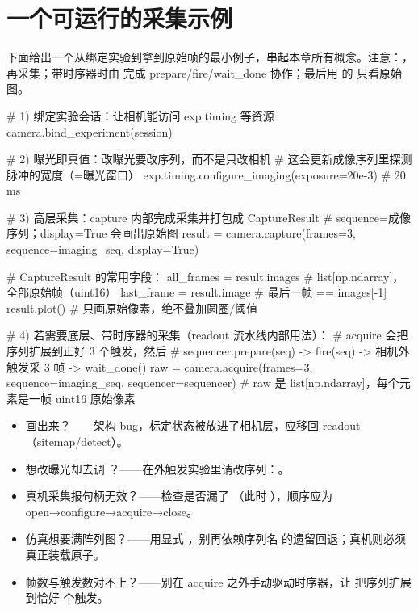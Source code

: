\documentclass[11pt,oneside,openany]{book}
\begin{document}
\section{一个可运行的采集示例}

下面给出一个从绑定实验到拿到原始帧的最小例子，串起本章所有概念。注意：，再采集；带时序器时由  完成 prepare/fire/wait\_done 协作；最后用  的  只看原始图。

\begin{codeblock}[Python]
# 1) 绑定实验会话：让相机能访问 exp.timing 等资源
camera.bind_experiment(session)

# 2) 曝光即真值：改曝光要改序列，而不是只改相机
#    这会更新成像序列里探测脉冲的宽度（=曝光窗口）
exp.timing.configure_imaging(exposure=20e-3)  # 20 ms

# 3) 高层采集：capture 内部完成采集并打包成 CaptureResult
#    sequence=成像序列；display=True 会画出原始图
result = camera.capture(frames=3, sequence=imaging_seq, display=True)

# CaptureResult 的常用字段：
all_frames = result.images   # list[np.ndarray]，全部原始帧（uint16）
last_frame = result.image    # 最后一帧 == images[-1]
result.plot()                # 只画原始像素，绝不叠加圆圈/阈值

# 4) 若需要底层、带时序器的采集（readout 流水线内部用法）：
#    acquire 会把序列扩展到正好 3 个触发，然后
#    sequencer.prepare(seq) -> fire(seq) -> 相机外触发采 3 帧 -> wait_done()
raw = camera.acquire(frames=3, sequence=imaging_seq, sequencer=sequencer)
# raw 是 list[np.ndarray]，每个元素是一帧 uint16 原始像素
\end{codeblock}

\begin{notebox}[自检清单]
\begin{itemize}
\item {} 画出来？——架构 bug，标定状态被放进了相机层，应移回 readout（sitemap/detect）。
\item 想改曝光却去调 ？——在外触发实验里请改序列：。
\item 真机采集报句柄无效？——检查是否漏了 （此时 ），顺序应为 open→configure→acquire→close。
\item 仿真想要满阵列图？——用显式 ，别再依赖序列名  的遗留回退；真机则必须真正装载原子。
\item 帧数与触发数对不上？——别在 acquire 之外手动驱动时序器，让  把序列扩展到恰好  个触发。
\end{itemize}
\end{notebox}
\end{document}

